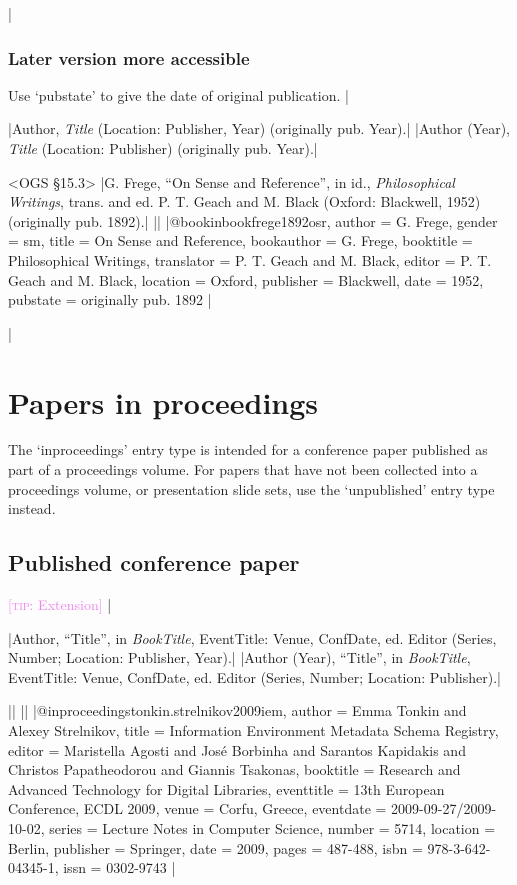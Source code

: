 \documentclass[extrafontsizes,11pt,a4paper,oneside]{memoir}
\newcommand*{\lit}[1]{\textsf{#1}}
\newcommand*{\code}[1]{`\textsf{#1}'}
\newcommand*{\aside}[1]{\textcolor{violet}{[\textsc{tip:} #1]}}
\begin{document}
\todoc|
\subsection{Later version more accessible}

Use \code{pubstate} to give the date of original publication.
|

\specs
|Author, \emph{Title} (Location: Publisher, Year) (\lit{originally pub.} Year).|%
|Author (Year), \emph{Title} (Location: Publisher) (\lit{originally pub.} Year).|

\bibexample<OGS \S15.3>
|G. Frege, \enquote{On Sense and Reference}, in id., \emph{Philosophical Writings}, trans. and ed. P. T. Geach and M. Black (Oxford: Blackwell, 1952) (originally pub. 1892).|%
||%
|@bookinbook{frege1892osr,
  author = {G. Frege},
  gender = {sm},
  title = {On Sense and Reference},
  bookauthor = {G. Frege},
  booktitle = {Philosophical Writings},
  translator = {P. T. Geach and M. Black},
  editor = {P. T. Geach and M. Black},
  location = {Oxford},
  publisher = {Blackwell},
  date = {1952},
  pubstate = {originally pub\adddotspace 1892}
}|

\todoc|
\chapter{Papers in proceedings}\label{sec:inproceedings}

The \code{inproceedings} entry type is intended for a conference paper published as part of a proceedings volume. For papers that have not been collected into a proceedings volume, or presentation slide sets, use the \code{unpublished} entry type instead.

\section{Published conference paper}
\aside{Extension}
|

\specs
|Author, \enquote{Title}, \lit{in} \emph{BookTitle}, EventTitle: Venue, ConfDate, \lit{ed.} Editor (Series, Number; Location: Publisher, Year).|%
|Author (Year), \enquote{Title}, \lit{in} \emph{BookTitle}, EventTitle: Venue, ConfDate, \lit{ed.} Editor (Series, Number; Location: Publisher).|

\bibexample
||%
||%
|@inproceedings{tonkin.strelnikov2009iem,
  author = {Emma Tonkin and Alexey Strelnikov},
  title = {Information Environment Metadata Schema Registry},
  editor = {Maristella Agosti and José Borbinha and Sarantos Kapidakis and Christos Papatheodorou and Giannis Tsakonas},
  booktitle = {Research and Advanced Technology for Digital Libraries},
  eventtitle = {13th European Conference, ECDL 2009},
  venue = {Corfu, Greece},
  eventdate = {2009-09-27/2009-10-02},
  series = {Lecture Notes in Computer Science},
  number = {5714},
  location = {Berlin},
  publisher = {Springer},
  date = {2009},
  pages = {487-488},
  isbn = {978-3-642-04345-1},
  issn = {0302-9743}
}|
\end{document}
